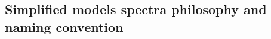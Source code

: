 \subsection{Simplified models spectra philosophy and naming convention}
\def\chitz{\ensuremath{\widetilde{\chi}^0_2}}
\def\chiz{\ensuremath{\widetilde{\chi}^0_1}}
\def\chipm{\ensuremath{\widetilde{\chi}^\pm_1}}
\def\chimp{\ensuremath{\widetilde{\chi}^\mp_1}}
\def\tchi{\ensuremath{\widetilde{\chi}}}
\def\gl{\tilde{g}}
\def\sTop{\ensuremath{\tilde{t}}\xspace}
\def\st{\ensuremath{\tilde{t}}\xspace}
\def\slep{\ensuremath{\tilde{l}}\xspace}
\def\snu{\ensuremath{\tilde{\nu}}\xspace}
\def\sBottom{\tilde{b}}
\def\sb{\tilde{b}}
\def\sq{\tilde{q}}
\def\sb{\tilde{b}}
\def\st{\tilde{t}}
\def\fb{\mathrm{fb}}
\def\to{\rightarrow}
\def\first{1$^\mathrm{st}$}
\def\second{2$^\mathrm{nd}$\xspace}
\def\third{3$^\mathrm{rd}$\xspace}
\def\spacer{\hspace*{10mm} }
\newcommand\fixme[1]{{\color{red}FIXME #1}}
\newcommand\model[1]{{\tt #1}}
\newcommand\url[1]{{\nopagebreak{\tt #1}}}
\newcommand\smallurl[1]{{\small \tt #1}}
\newcommand{\AlphaT}{\ensuremath{\alpha_{\mathrm{T}}}\xspace} 
\newcommand{\ATLLepStop}{ATL lep-$\tilde{t}$}
\newcommand{\ATLHadStop}{ATL had-$\tilde{t}$}
\newcommand{\SSnoHT}{SSnoH$_{\mathrm{T}}$}
\newcommand{\HsTjets}{\ensuremath{\not\!\!\mathrm{H}_{\mathrm{T}}}+jets\xspace}
\newcommand{\MTtwo}{\ensuremath{{M}_{\mathrm{T2}}}\xspace}  
\newcommand{\emu}{\ensuremath{e/\mu}\xspace}
\newcommand{\ETslash}{\ensuremath{\not\!\!\rm{E}_{\mathrm{T}}}\xspace} 
\newcommand{\ZMET}{Z+\ETslash}
\newcommand{\sigmaXBF}{\mbox{\ensuremath{\sigma\times\mathcal{B}}}\xspace}

\label{ssec:names}

